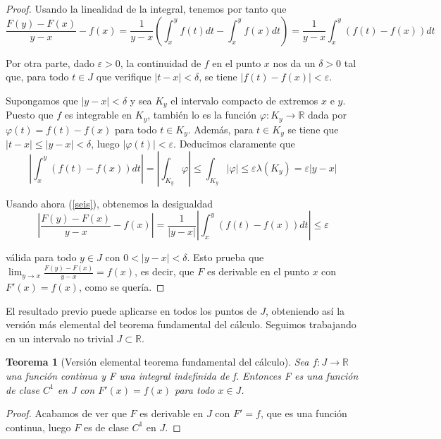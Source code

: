 \documentclass[a4paper, 12pt]{article}
\newtheorem{teorema}{Teorema}
\begin{document}
\begin{enumerate}[label=\textbf{\arabic*}.]
\begin{proof}
	Usando la linealidad de la integral, tenemos por tanto que
	\begin{equation}\label{seis}
		\frac{F(y) - F(x)}{y-x} - f(x) = \frac{1}{y-x} \left( \int_x^y f(t) dt - \int_x^y f(x) dt \right) = \frac{1}{y-x} \int_x^y (f(t) - f(x)) dt
	\end{equation}
	
	Por otra parte, dado \(\varepsilon > 0\), la continuidad de \(f\) en el punto \(x\) nos da un \(\delta > 0\) tal que, para todo \(t \in J\) que verifique \(| t -x| < \delta\), se tiene \(| f(t) - f(x) | < \varepsilon\).
	
	Supongamos que \(|y - x | < \delta\) y sea \(K_y\) el intervalo compacto de extremos \(x\) e \(y\). Puesto que \(f\) es integrable en \(K_y\), también lo es la función \(\varphi : K_y \to \mathbb{R}\) dada por \(\varphi (t) = f(t) - f(x)\) para todo \(t \in K_y\). Además, para \(t \in K_y\) se tiene que \(|t-x| \leq |y-x| < \delta\), luego \(| \varphi (t) | < \varepsilon\). Deducimos claramente que
	\[
		\left| \int_x^y (f(t) - f(x)) dt \right| = \left| \int_{K_y} \varphi \right| \leq \int_{K_y} | \varphi| \leq \varepsilon \lambda (K_y) = \varepsilon |y-x|
	\] 
	
	Usando ahora (\ref{seis}), obtenemos la desigualdad
	\[
		\left| \frac{F(y) - F(x)}{y-x} - f(x) \right| = \frac{1}{|y-x|} \left| \int_x^y (f(t) - f(x)) dt \right| \leq \varepsilon
	\]
	
	válida para todo \(y \in J\) con \(0 < |y-x| < \delta\). Esto prueba que \(\lim_{y \to x} \frac{F(y) - F(x)}{y-x} = f(x)\), es decir, que \(F\) es derivable en el punto \(x\) con \(F'(x) = f(x)\), como se quería.
	\end{proof}
	
	\medskip
	
	El resultado previo puede aplicarse en todos los puntos de \(J\), obteniendo así la versión más elemental del teorema fundamental del cálculo. Seguimos trabajando en un intervalo no trivial \(J \subset \mathbb{R}\).
	
	\begin{teorema}[Versión elemental teorema fundamental del cálculo]
	Sea \(f: J \to \mathbb{R}\) una función continua y F una integral indefinida de f. Entonces F es una función de clase \(C^1\) en J con \(F'(x) = f(x)\) para todo \(x \in J\).
	\end{teorema}
	
	\begin{proof}
	Acabamos de ver que \(F\) es derivable en \(J\) con \(F' = f\), que es una función continua, luego \(F\) es de clase \(C^1\) en \(J\).
	\end{proof}
\end{enumerate}
\end{document}
